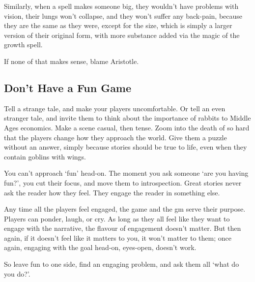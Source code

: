 \begin{multicols}{2}
Similarly, when a spell makes someone big, they wouldn't have problems with vision, their lungs won't collapse, and they won't suffer any back-pain, because they are the same as they were, except for the size, which is simply a larger version of their original form, with more substance added via the magic of the growth spell.

If none of that makes sense, blame Aristotle.

\subsection{Don't Have a Fun Game}

Tell a strange tale, and make your players uncomfortable.
Or tell an even stranger tale, and invite them to think about the importance of rabbits to Middle Ages economics.
Make a scene casual, then tense.
Zoom into the death of  so hard that the players change how they approach the world.
Give them a puzzle without an answer, simply because stories should be true to life, even when they contain goblins with wings.

You can't approach `fun' head-on.
The moment you ask someone `are you having fun?', you cut their focus, and move them to introspection.
Great stories never ask the reader how they feel.
They engage the reader in something else.

Any time all the players feel engaged, the game and the \gls{gm} serve their purpose.
Players can ponder, laugh, or cry.
As long as they all feel like they want to engage with the narrative, the flavour of engagement doesn't matter.
But then again, if it doesn't feel like it matters to you, it won't matter to them; once again, engaging with the goal head-on, eyes-open, doesn't work.

So leave fun to one side, find an engaging problem, and ask them all `what do you do?'.

\end{multicols}
